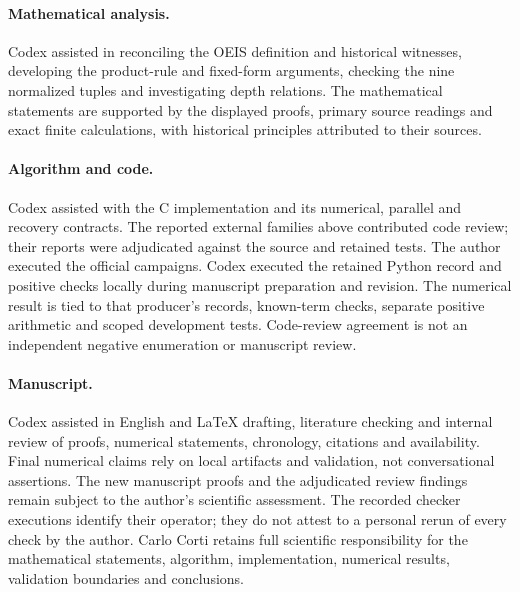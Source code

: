 \documentclass[11pt]{article}
\theoremstyle{definition}
\theoremstyle{remark}
\begin{document}
\paragraph{Mathematical analysis.}
Codex assisted in reconciling the OEIS definition and historical
witnesses, developing the product-rule and fixed-form arguments,
checking the nine normalized tuples and investigating depth
relations. The mathematical statements are supported by the
displayed proofs, primary source readings and exact finite
calculations, with historical principles attributed to their sources.

\paragraph{Algorithm and code.}
Codex assisted with the C implementation and its numerical,
parallel and recovery contracts. The reported external families
above contributed code review; their reports were adjudicated
against the source and retained tests. The author executed the official
campaigns. Codex executed the retained Python record and positive
checks locally during manuscript preparation and revision. The numerical result is tied to that producer's records,
known-term checks, separate positive arithmetic and scoped
development tests. Code-review agreement is not an independent
negative enumeration or manuscript review.

\paragraph{Manuscript.}
Codex assisted in English and LaTeX drafting, literature checking
and internal review of proofs, numerical statements, chronology,
citations and availability. Final numerical claims rely on local
artifacts and validation, not conversational assertions. The new
manuscript proofs and the adjudicated review findings remain
subject to the author's scientific assessment. The recorded checker
executions identify their operator; they do not attest to a personal
rerun of every check by the author. Carlo Corti retains full scientific
responsibility for the mathematical statements, algorithm,
implementation, numerical results, validation boundaries and
conclusions.
\end{document}
